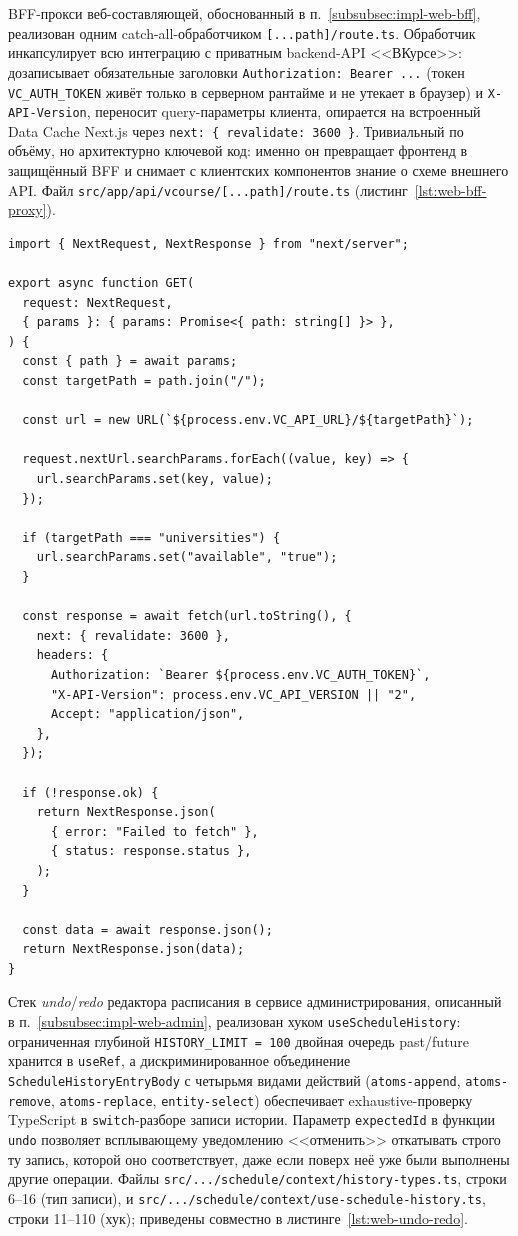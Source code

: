 BFF-прокси веб-составляющей, обоснованный в п.~\ref{subsubsec:impl-web-bff}, реализован одним catch-all-обработчиком \texttt{[...path]/route.ts}. Обработчик инкапсулирует всю интеграцию с приватным backend-API <<ВКурсе>>: дозаписывает обязательные заголовки \texttt{Authorization: Bearer ...} (токен \texttt{VC\_AUTH\_TOKEN} живёт только в серверном рантайме и не утекает в браузер) и \texttt{X-API-Version}, переносит query-параметры клиента, опирается на встроенный Data Cache Next.js через \texttt{next:~\{~revalidate:~3600~\}}. Тривиальный по объёму, но архитектурно ключевой код: именно он превращает фронтенд в защищённый BFF и снимает с клиентских компонентов знание о схеме внешнего API. Файл \texttt{src/app/api/vcourse/[...path]/route.ts} (листинг~\ref{lst:web-bff-proxy}).

\begin{lstlisting}[caption={BFF-прокси к серверной части с инъекцией заголовков аутентификации и версии API},label=lst:web-bff-proxy]
import { NextRequest, NextResponse } from "next/server";

export async function GET(
  request: NextRequest,
  { params }: { params: Promise<{ path: string[] }> },
) {
  const { path } = await params;
  const targetPath = path.join("/");

  const url = new URL(`${process.env.VC_API_URL}/${targetPath}`);

  request.nextUrl.searchParams.forEach((value, key) => {
    url.searchParams.set(key, value);
  });

  if (targetPath === "universities") {
    url.searchParams.set("available", "true");
  }

  const response = await fetch(url.toString(), {
    next: { revalidate: 3600 },
    headers: {
      Authorization: `Bearer ${process.env.VC_AUTH_TOKEN}`,
      "X-API-Version": process.env.VC_API_VERSION || "2",
      Accept: "application/json",
    },
  });

  if (!response.ok) {
    return NextResponse.json(
      { error: "Failed to fetch" },
      { status: response.status },
    );
  }

  const data = await response.json();
  return NextResponse.json(data);
}
\end{lstlisting}

Стек \emph{undo}/\emph{redo} редактора расписания в сервисе администрирования, описанный в п.~\ref{subsubsec:impl-web-admin}, реализован хуком \texttt{useScheduleHistory}: ограниченная глубиной \texttt{HISTORY\_LIMIT~=~100} двойная очередь past/future хранится в \texttt{useRef}, а дискриминированное объединение \texttt{ScheduleHistoryEntryBody} с четырьмя видами действий (\texttt{atoms-append}, \texttt{atoms-remove}, \texttt{atoms-replace}, \texttt{entity-select}) обеспечивает exhaustive-проверку TypeScript в \texttt{switch}-разборе записи истории. Параметр \texttt{expectedId} в функции \texttt{undo} позволяет всплывающему уведомлению <<отменить>> откатывать строго ту запись, которой оно соответствует, даже если поверх неё уже были выполнены другие операции. Файлы \texttt{src/.../schedule/context/history-types.ts}, строки 6--16 (тип записи), и \texttt{src/.../schedule/context/use-schedule-history.ts}, строки 11--110 (хук); приведены совместно в листинге~\ref{lst:web-undo-redo}.

